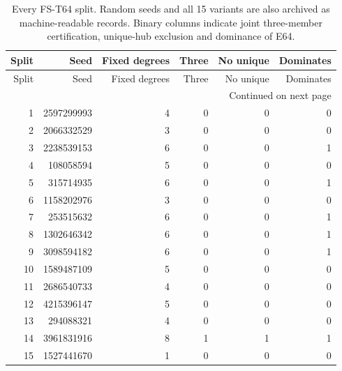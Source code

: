\begin{longtable}{rrrrrr}

\caption{Every FS-T64 split. Random seeds and all 15 variants are also archived as machine-readable records. Binary columns indicate joint three-member certification, unique-hub exclusion and dominance of E64.}\label{tab:all-splits}\\

\toprule Split & Seed & Fixed degrees & Three & No unique & Dominates\\\midrule\endfirsthead

\toprule Split & Seed & Fixed degrees & Three & No unique & Dominates\\\midrule\endhead

\midrule\multicolumn{6}{r}{Continued on next page}\\\endfoot\bottomrule\endlastfoot

1 & 2597299993 & 4 & 0 & 0 & 0\\

2 & 2066332529 & 3 & 0 & 0 & 0\\

3 & 2238539153 & 6 & 0 & 0 & 1\\

4 & 108058594 & 5 & 0 & 0 & 0\\

5 & 315714935 & 6 & 0 & 0 & 1\\

6 & 1158202976 & 3 & 0 & 0 & 0\\

7 & 253515632 & 6 & 0 & 0 & 1\\

8 & 1302646342 & 6 & 0 & 0 & 1\\

9 & 3098594182 & 6 & 0 & 0 & 1\\

10 & 1589487109 & 5 & 0 & 0 & 0\\

11 & 2686540733 & 4 & 0 & 0 & 0\\

12 & 4215396147 & 5 & 0 & 0 & 0\\

13 & 294088321 & 4 & 0 & 0 & 0\\

14 & 3961831916 & 8 & 1 & 1 & 1\\

15 & 1527441670 & 1 & 0 & 0 & 0\\


\end{longtable}

